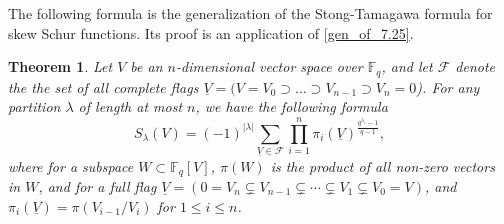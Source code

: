 \documentclass[12pt,a4paper]{report}
\newtheorem{theorem}{Theorem}[chapter]
\theoremstyle{definition}
\theoremstyle{remark}
\theoremstyle{definition}
\begin{document}
The following formula is the generalization of the Stong-Tamagawa formula for skew Schur functions. Its proof is an application of \cref{gen_of_7.25}.
\begin{theorem}\label{main_rewrite}
Let $V$ be an $n$-dimensional vector space over $\mathbb{F}_q$, and let $\mathcal{F}$ denote the the set of all complete flags $\underline{V} = (V=V_0 \supset \ldots \supset V_{n-1} \supset V_n = 0$). For any partition $\lambda$ of length at most $n$, we have the following formula
\begin{equation*}  
    S_\lambda(V) = (-1)^{|\lambda|} \sum\limits_{\underline{V} \in \mathcal{F}}\prod\limits_{i=1}^{n} \pi_i (\underline{V})^{\frac{q^{\lambda_{i}}-1}{q-1}},
\end{equation*}
where for a subspace $W \subset \mathbb{F}_q[V]$, $\pi(W)$ is the product of all non-zero vectors in $W$, and for a full flag $\underline{V} = (0 = V_n \subsetneq V_{n-1}\subsetneq \cdots \subsetneq V_1\subsetneq V_0 = V)$, and $\pi_i(\underline{V}) = \pi(V_{i-1}/V_i)$ for $1 \leq i \leq n$.
\end{theorem}
\end{document}
